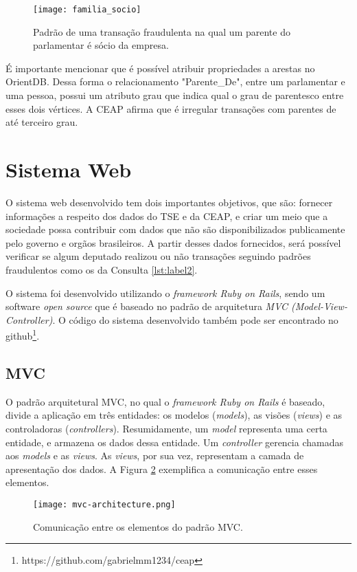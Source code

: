 \begin{figure}[H]
\centering
\texttt{[image: familia\_socio]}
\caption{Padrão de uma transação fraudulenta na qual um parente do parlamentar é sócio da empresa.}
\label{fig:familia_socio}
\end{figure}

	É importante mencionar que é possível atribuir propriedades a arestas no OrientDB. Dessa forma o relacionamento "Parente\_De", entre um parlamentar e uma pessoa, possui um atributo grau que indica qual o grau de parentesco entre esses dois vértices. A CEAP afirma que é irregular transações com parentes de até terceiro grau.

\section{Sistema Web}

	O sistema web desenvolvido tem dois importantes objetivos, que são: fornecer informações a respeito dos dados do TSE e da CEAP, e criar um meio que a sociedade possa contribuir com dados que não são disponibilizados publicamente pelo governo e orgãos brasileiros. A partir desses dados fornecidos, será possível verificar se algum deputado realizou ou não transações seguindo padrões fraudulentos como os da Consulta \ref{lst:label2}.
	
	O sistema foi desenvolvido utilizando o \textit{framework Ruby on Rails}, sendo um software \textit{open source} que é baseado no padrão de arquitetura \textit{MVC (Model-View-Controller)}. O código do sistema desenvolvido também pode ser encontrado no github\footnote{https://github.com/gabrielmm1234/ceap}.

\subsection{MVC} \label{mvc-subsection}

	O padrão arquitetural MVC, no qual o \textit{framework Ruby on Rails} é baseado, divide a aplicação em três entidades: os modelos (\textit{models}), as visões (\textit{views}) e as controladoras (\textit{controllers}). Resumidamente, um \textit{model} representa uma certa entidade, e armazena os dados dessa entidade. Um \textit{controller} gerencia chamadas aos \textit{models} e as \textit{views}. As \textit{views}, por sua vez, representam a camada de apresentação dos dados. A Figura \ref{fig:mvc} exemplifica a comunicação entre esses elementos.
	
\begin{figure}[H]
\centering
\texttt{[image: mvc-architecture.png]}
\caption{Comunicação entre os elementos do padrão MVC.}
\label{fig:mvc}
\end{figure}

